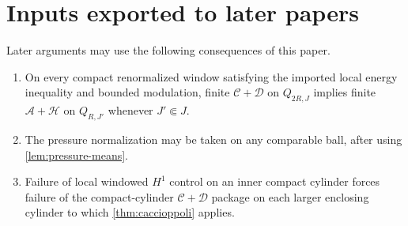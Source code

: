 \documentclass[11pt]{amsart}
\theoremstyle{plain}
\theoremstyle{definition}
\theoremstyle{remark}
\begin{document}
\section{Inputs exported to later papers}

Later arguments may use the following consequences of this paper.
\begin{enumerate}[label=\textup{(\arabic*)}]
\item On every compact renormalized window satisfying the imported local energy
inequality and bounded modulation, finite $\mathcal C+\mathcal D$ on
$Q_{2R,J}$ implies finite $\mathcal A+\mathcal H$ on $Q_{R,J'}$ whenever
$J'\Subset J$.
\item The pressure normalization may be taken on any comparable ball, after
using \cref{lem:pressure-means}.
\item Failure of local windowed $H^1$ control on an inner compact cylinder
forces failure of the compact-cylinder $\mathcal C+\mathcal D$ package on each
larger enclosing cylinder to which \cref{thm:caccioppoli} applies.
\end{enumerate}



\end{document}
